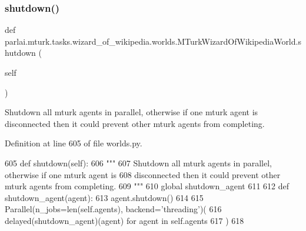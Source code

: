 \subsubsection{\texorpdfstring{shutdown()}{shutdown()}}
{\footnotesize\ttfamily def parlai.\+mturk.\+tasks.\+wizard\+\_\+of\+\_\+wikipedia.\+worlds.\+M\+Turk\+Wizard\+Of\+Wikipedia\+World.\+shutdown (\begin{DoxyParamCaption}\item[{}]{self }\end{DoxyParamCaption})}

\begin{DoxyVerb}Shutdown all mturk agents in parallel, otherwise if one mturk agent is
disconnected then it could prevent other mturk agents from completing.
\end{DoxyVerb}
 

Definition at line 605 of file worlds.\+py.


\begin{DoxyCode}
605     \textcolor{keyword}{def }shutdown(self):
606         \textcolor{stringliteral}{"""}
607 \textcolor{stringliteral}{        Shutdown all mturk agents in parallel, otherwise if one mturk agent is}
608 \textcolor{stringliteral}{        disconnected then it could prevent other mturk agents from completing.}
609 \textcolor{stringliteral}{        """}
610         \textcolor{keyword}{global} shutdown\_agent
611 
612         \textcolor{keyword}{def }shutdown\_agent(agent):
613             agent.shutdown()
614 
615         Parallel(n\_jobs=len(self.agents), backend=\textcolor{stringliteral}{'threading'})(
616             delayed(shutdown\_agent)(agent) \textcolor{keywordflow}{for} agent \textcolor{keywordflow}{in} self.agents
617         )
618 \end{DoxyCode}
\mbox{\label{classparlai_1_1mturk_1_1tasks_1_1wizard__of__wikipedia_1_1worlds_1_1MTurkWizardOfWikipediaWorld_ac5774d235722eef3721845e5cc4ad588}} 
